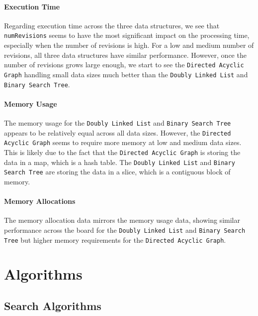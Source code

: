 \paragraph{Execution Time}
Regarding execution time across the three data structures, we see that \lstinline{numRevisions} seems to have the most significant impact on the processing time, especially when the number of revisions is high. For a low and medium number of revisions, all three data structures have similar performance. However, once the number of revisions grows large enough, we start to see the \lstinline{Directed Acyclic Graph} handling small data sizes much better than the \lstinline{Doubly Linked List} and \lstinline{Binary Search Tree}.
\smallskip

\paragraph{Memory Usage}
The memory usage for the \lstinline{Doubly Linked List} and \lstinline{Binary Search Tree} appears to be relatively equal across all data sizes. However, the \lstinline{Directed Acyclic Graph} seems to require more memory at low and medium data sizes. This is likely due to the fact that the \lstinline{Directed Acyclic Graph} is storing the data in a map, which is a hash table. The \lstinline{Doubly Linked List} and \lstinline{Binary Search Tree} are storing the data in a slice, which is a contiguous block of memory.
\smallskip

\paragraph{Memory Allocations}
The memory allocation data mirrors the memory usage data, showing similar performance across the board for the \lstinline{Doubly Linked List} and \lstinline{Binary Search Tree} but higher memory requirements for the \lstinline{Directed Acyclic Graph}.

\section{Algorithms}

\subsection{Search Algorithms}

